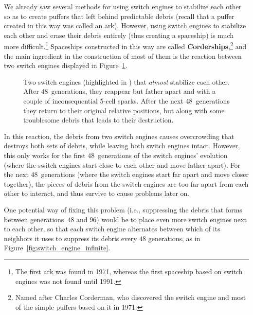 We already saw several methods for using switch engines to stabilize each other so as to create puffers that left behind predictable debris (recall that a puffer created in this way was called an ark). However, using switch engines to stabilize each other and erase their debris entirely (thus creating a spaceship) is much more difficult.\footnote{The first ark was found in 1971, whereas the first spaceship based on switch engines was not found until 1991.} Spaceships constructed in this way are called \textbf{Corderships},\footnote{Named after Charles Corderman, who discovered the switch engine and most of the simple puffers based on it in 1971.} and the main ingredient in the construction of most of them is the reaction between two switch engines displayed in Figure~\ref{fig:switch_engine_48}.

\begin{figure}[!htb]
	\centering{}
	\caption{Two switch engines (highlighted in ) that \emph{almost} stabilize each other. After 48~generations, they reappear but father apart and with a couple of inconsequential 5-cell sparks. After the next 48~generations they return to their original relative positions, but along with some troublesome debris that leads to their destruction.}\label{fig:switch_engine_48}
\end{figure}

In this reaction, the debris from two switch engines causes overcrowding that destroys both sets of debris, while leaving both switch engines intact. However, this only works for the first 48~generations of the switch engines' evolution (where the switch engines start close to each other and move father apart). For the next 48~generations (where the switch engines start far apart and move closer together), the pieces of debris from the switch engines are too far apart from each other to interact, and thus survive to cause problems later on.

One potential way of fixing this problem (i.e., suppressing the debris that forms between generations~$48$ and $96$) would be to place even more switch engines next to each other, so that each switch engine alternates between which of its neighbors it uses to suppress its debris every $48$ generations, as in Figure~\ref{fig:switch_engine_infinite}.

